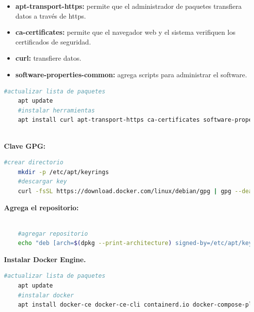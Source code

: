 			\begin{itemize}
				
				\item\textbf{apt-transport-https:} permite que el administrador de paquetes transfiera datos a través de https.
				
				\item\textbf{ca-certificates:} permite que el navegador web y el sistema verifiquen los certificados de seguridad.
				
				\item\textbf{curl:} transfiere datos.
				
				\item \textbf{software-properties-common:} agrega scripts para administrar el software.
				
			\end{itemize}	
				
				
			\begin{lstlisting}[language=Bash, caption=Paquetes necesarios]
	#actualizar lista de paquetes
	apt update
	#instalar herramientas
	apt install curl apt-transport-https ca-certificates software-properties-common
	
			\end{lstlisting}
			
			\textbf{Clave GPG:}\par
			
			\begin{lstlisting}[language=Bash, caption=Clave GPG]
	#crear directorio
	mkdir -p /etc/apt/keyrings
	#descargar key
	curl -fsSL https://download.docker.com/linux/debian/gpg | gpg --dearmor -o /etc/apt/keyrings/docker.gpg
			\end{lstlisting}
		
			\textbf{Agrega el repositorio:}
	
			\begin{lstlisting}[language=Bash, caption=Repositorio]

	#agregar repositorio
	echo "deb [arch=$(dpkg --print-architecture) signed-by=/etc/apt/keyrings/docker.gpg] https://download.docker.com/linux/debian $(lsb_release -cs) stable" | sudo tee /etc/apt/sources.list.d/docker.list > /dev/null
			\end{lstlisting}
	
			\textbf{Instalar Docker Engine.}\par
	
	
			\begin{lstlisting}[language=Bash,caption=docker]
	#actualizar lista de paquetes
	apt update
	#instalar docker
	apt install docker-ce docker-ce-cli containerd.io docker-compose-plugins
			\end{lstlisting}


